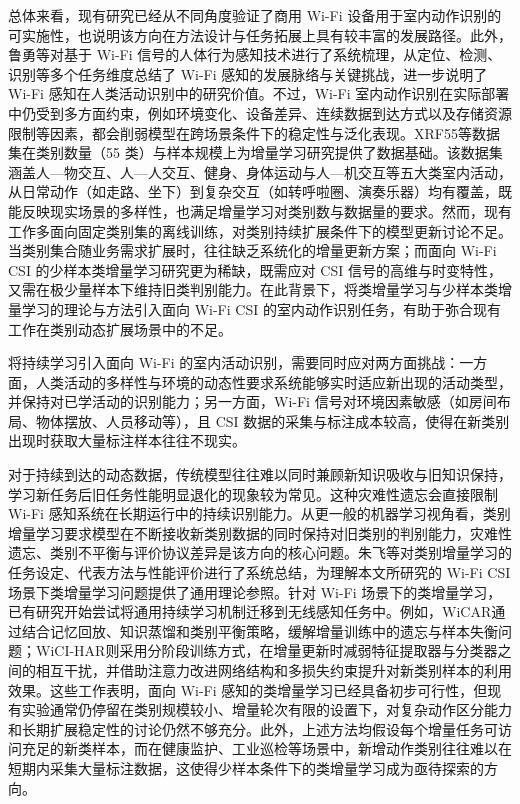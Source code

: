 总体来看，现有研究已经从不同角度验证了商用 Wi-Fi 设备用于室内动作识别的可实施性，也说明该方向在方法设计与任务拓展上具有较丰富的发展路径。此外，鲁勇等对基于 Wi-Fi 信号的人体行为感知技术进行了系统梳理，从定位、检测、识别等多个任务维度总结了 Wi-Fi 感知的发展脉络与关键挑战，进一步说明了 Wi-Fi 感知在人类活动识别中的研究价值\cite{luyong2019wifiharreview}。不过，Wi-Fi 室内动作识别在实际部署中仍受到多方面约束，例如环境变化、设备差异、连续数据到达方式以及存储资源限制等因素，都会削弱模型在跨场景条件下的稳定性与泛化表现\cite{ma2019wifi}。XRF55\cite{wang2024xrf55}等数据集在类别数量（55 类）与样本规模上为增量学习研究提供了数据基础。该数据集涵盖人—物交互、人—人交互、健身、身体运动与人—机交互等五大类室内活动，从日常动作（如走路、坐下）到复杂交互（如转呼啦圈、演奏乐器）均有覆盖，既能反映现实场景的多样性，也满足增量学习对类别数与数据量的要求。然而，现有工作多面向固定类别集的离线训练，对类别持续扩展条件下的模型更新讨论不足。当类别集合随业务需求扩展时，往往缺乏系统化的增量更新方案；而面向 Wi-Fi CSI 的少样本类增量学习研究更为稀缺，既需应对 CSI 信号的高维与时变特性，又需在极少量样本下维持旧类判别能力。在此背景下，将类增量学习与少样本类增量学习的理论与方法引入面向 Wi-Fi CSI 的室内动作识别任务，有助于弥合现有工作在类别动态扩展场景中的不足。


将持续学习引入面向 Wi-Fi 的室内活动识别，需要同时应对两方面挑战：一方面，人类活动的多样性与环境的动态性要求系统能够实时适应新出现的活动类型，并保持对已学活动的识别能力；另一方面，Wi-Fi 信号对环境因素敏感（如房间布局、物体摆放、人员移动等），且 CSI 数据的采集与标注成本较高，使得在新类别出现时获取大量标注样本往往不现实\cite{ma2019wifi}。

对于持续到达的动态数据，传统模型往往难以同时兼顾新知识吸收与旧知识保持，学习新任务后旧任务性能明显退化的现象较为常见。这种灾难性遗忘会直接限制 Wi-Fi 感知系统在长期运行中的持续识别能力。从更一般的机器学习视角看，类别增量学习要求模型在不断接收新类别数据的同时保持对旧类别的判别能力，灾难性遗忘、类别不平衡与评价协议差异是该方向的核心问题。朱飞等对类别增量学习的任务设定、代表方法与性能评价进行了系统总结，为理解本文所研究的 Wi-Fi CSI 场景下类增量学习问题提供了通用理论参照\cite{zhufei2023cilreview}。针对 Wi-Fi 场景下的类增量学习，已有研究开始尝试将通用持续学习机制迁移到无线感知任务中。例如，WiCAR\cite{licar2024wicar}通过结合记忆回放、知识蒸馏和类别平衡策略，缓解增量训练中的遗忘与样本失衡问题；WiCI-HAR\cite{ding2023wicihar}则采用分阶段训练方式，在增量更新时减弱特征提取器与分类器之间的相互干扰，并借助注意力改进网络结构和多损失约束提升对新类别样本的利用效果。这些工作表明，面向 Wi-Fi 感知的类增量学习已经具备初步可行性，但现有实验通常仍停留在类别规模较小、增量轮次有限的设置下，对复杂动作区分能力和长期扩展稳定性的讨论仍然不够充分。此外，上述方法均假设每个增量任务可访问充足的新类样本，而在健康监护、工业巡检等场景中，新增动作类别往往难以在短期内采集大量标注数据，这使得少样本条件下的类增量学习成为亟待探索的方向。

